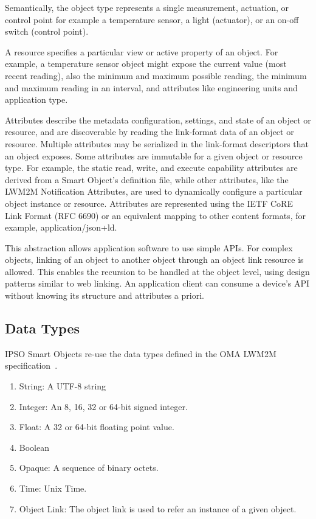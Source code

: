 \documentclass[peerreview, a4paper, 7pt]{IEEEtran}
\begin{document}
Semantically, the object type represents a single measurement, actuation, or control point for example a temperature sensor, a light (actuator), or an on-off switch (control point).

A resource specifies a particular view or active property of an object. For example, a temperature sensor object might expose the current value (most recent reading), also the minimum and maximum possible reading, the minimum and maximum reading in an interval, and attributes like engineering units and application type.

Attributes describe the metadata configuration, settings, and state of an object or resource, and are discoverable by reading the link-format data of an object or resource. Multiple attributes may be serialized in the link-format descriptors that an object exposes. Some attributes are immutable for a given object or resource type. For example, the static read, write, and execute capability attributes are derived from a Smart Object's definition file, while other attributes, like the LWM2M Notification Attributes, are used to dynamically configure a particular object instance or resource. Attributes are represented using the IETF CoRE Link Format (RFC 6690) or an equivalent mapping to other content formats, for example, application/json+ld.

This abstraction allows application software to use simple APIs. For complex objects, linking of an object to another object through an object link resource is allowed. This enables the recursion to be handled at the object level, using design patterns similar to web linking. An application client can consume a device’s API without knowing its structure and attributes a priori.

\subsection{Data Types}

IPSO Smart Objects re-use the data types defined in the OMA LWM2M specification~\cite{lwm2m}.

\begin{enumerate}
\item String: A UTF-8 string
\item Integer: An 8, 16, 32 or 64-bit signed integer.
\item Float: A 32 or 64-bit floating point value.
\item Boolean
\item Opaque: A sequence of binary octets.
\item Time: Unix Time.
\item Object Link: The object link is used to refer an instance of a given object. 
\end{enumerate}
\end{document}
